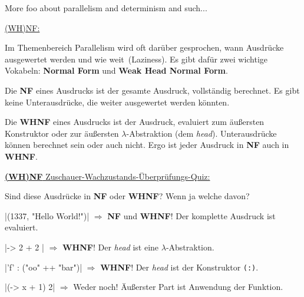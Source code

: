\documentclass{beamer}
\begin{document}

\begin{frame}
More foo about parallelism and determinism and such...
\end{frame}


\begin{frame}
\underline{(WH)NF:}\smallskip

Im Themenbereich Parallelism wird oft darüber gesprochen, wann Ausdrücke ausgewertet werden und \glqq wie weit\grqq\ (Laziness). Es gibt dafür zwei wichtige Vokabeln:
\textbf{Normal Form} und \textbf{Weak Head Normal Form}.\bigskip\pause

Die \textbf{NF} eines Ausdrucks ist der gesamte Ausdruck, vollständig berechnet. Es gibt keine Unterausdrücke, die weiter ausgewertet werden könnten.\bigskip\pause

Die \textbf{WHNF} eines Ausdrucks ist der Ausdruck, evaluiert zum äußersten Konstruktor oder zur äußersten $\lambda$-Abstraktion (dem \emph{head}). Unterausdrücke können berechnet sein oder auch nicht. Ergo ist jeder Ausdruck in \textbf{NF} auch in \textbf{WHNF}.
\end{frame}

\begin{frame}[fragile]

\underline{\textbf{(WH)NF} Zuschauer-Wachzustands-Überprüfungs-Quiz:}\smallskip

Sind diese Ausdrücke in \textbf{NF} oder \textbf{WHNF}? Wenn ja welche davon?
\bigskip\pause

|(1337, "Hello World!")|
\pause
$\Rightarrow$ \textbf{NF} und \textbf{WHNF}! Der komplette Ausdruck ist evaluiert.
\pause

|\x -> 2 + 2 |
\pause
$\Rightarrow$ \textbf{WHNF}! Der \emph{head} ist eine $\lambda$-Abstraktion.
\pause

|'f' : ("oo" ++ "bar")|
\pause
$\Rightarrow$ \textbf{WHNF}! Der \emph{head} ist der Konstruktor \texttt{(:)}.
\pause

|(\x -> x + 1) 2|
\pause
$\Rightarrow$ Weder noch! Äußerster Part ist Anwendung der Funktion.

\end{frame}

\end{document}
